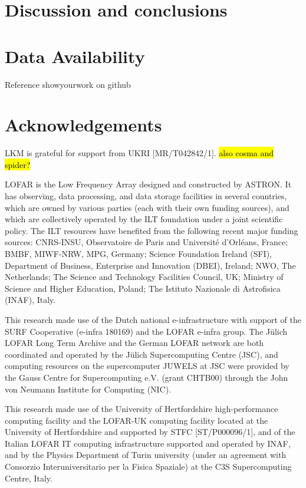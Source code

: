 \documentclass[usenatbib,fleqn,letters]{mnras}
\begin{document}
\section{Discussion and conclusions}


\section*{Data Availability}
Reference showyourwork on github

\section*{Acknowledgements}
LKM is grateful for support from UKRI [MR/T042842/1]. \hl{also cosma and spider?}

LOFAR is the Low Frequency Array designed and constructed by ASTRON. It has observing, data processing, and data storage facilities in several countries, which are owned by various parties (each with their own funding sources), and which are collectively operated by the ILT foundation under a joint scientific policy. The ILT resources have benefited from the following recent major funding sources: CNRS-INSU, Observatoire de Paris and Université d'Orléans, France; BMBF, MIWF-NRW, MPG, Germany; Science Foundation Ireland (SFI), Department of Business, Enterprise and Innovation (DBEI), Ireland; NWO, The Netherlands; The Science and Technology Facilities Council, UK; Ministry of Science and Higher Education, Poland; The Istituto Nazionale di Astrofisica (INAF), Italy.

This research made use of the Dutch national e-infrastructure with support of the SURF Cooperative (e-infra 180169) and the LOFAR e-infra group. The Jülich LOFAR Long Term Archive and the German LOFAR network are both coordinated and operated by the Jülich Supercomputing Centre (JSC), and computing resources on the supercomputer JUWELS at JSC were provided by the Gauss Centre for Supercomputing e.V. (grant CHTB00) through the John von Neumann Institute for Computing (NIC).

This research made use of the University of Hertfordshire high-performance computing facility and the LOFAR-UK computing facility located at the University of Hertfordshire and supported by STFC [ST/P000096/1], and of the Italian LOFAR IT computing infrastructure supported and operated by INAF, and by the Physics Department of Turin university (under an agreement with Consorzio Interuniversitario per la Fisica Spaziale) at the C3S Supercomputing Centre, Italy.
\end{document}
